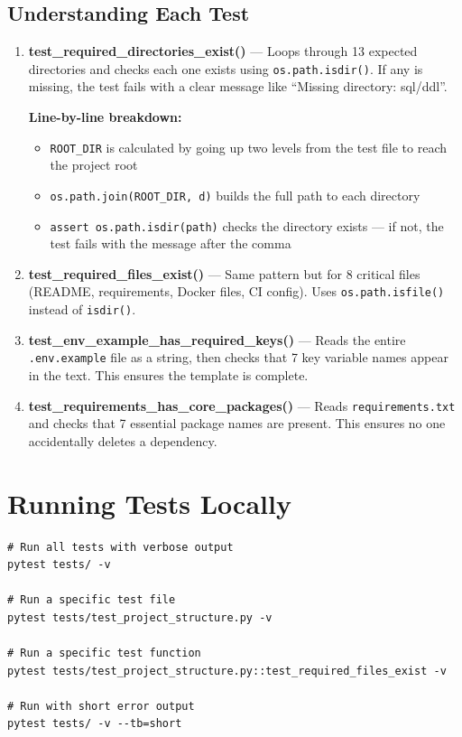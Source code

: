 \documentclass[12pt, a4paper, oneside]{report}
\begin{document}
\subsection{Understanding Each Test}

\begin{enumerate}[label=\textcolor{primary}{\textbf{Test \arabic*:}}]
    \item \textbf{test\_required\_directories\_exist()} --- Loops through 13 expected directories and checks each one exists using \texttt{os.path.isdir()}. If any is missing, the test fails with a clear message like ``Missing directory: sql/ddl''.

    \textbf{Line-by-line breakdown:}
    \begin{itemize}
        \item \texttt{ROOT\_DIR} is calculated by going up two levels from the test file to reach the project root
        \item \texttt{os.path.join(ROOT\_DIR, d)} builds the full path to each directory
        \item \texttt{assert os.path.isdir(path)} checks the directory exists --- if not, the test fails with the message after the comma
    \end{itemize}

    \item \textbf{test\_required\_files\_exist()} --- Same pattern but for 8 critical files (README, requirements, Docker files, CI config). Uses \texttt{os.path.isfile()} instead of \texttt{isdir()}.

    \item \textbf{test\_env\_example\_has\_required\_keys()} --- Reads the entire \texttt{.env.example} file as a string, then checks that 7 key variable names appear in the text. This ensures the template is complete.

    \item \textbf{test\_requirements\_has\_core\_packages()} --- Reads \texttt{requirements.txt} and checks that 7 essential package names are present. This ensures no one accidentally deletes a dependency.
\end{enumerate}

\section{Running Tests Locally}

\begin{lstlisting}[style=bashstyle, caption={How to run tests}]
# Run all tests with verbose output
pytest tests/ -v

# Run a specific test file
pytest tests/test_project_structure.py -v

# Run a specific test function
pytest tests/test_project_structure.py::test_required_files_exist -v

# Run with short error output
pytest tests/ -v --tb=short
\end{lstlisting}
\end{document}
